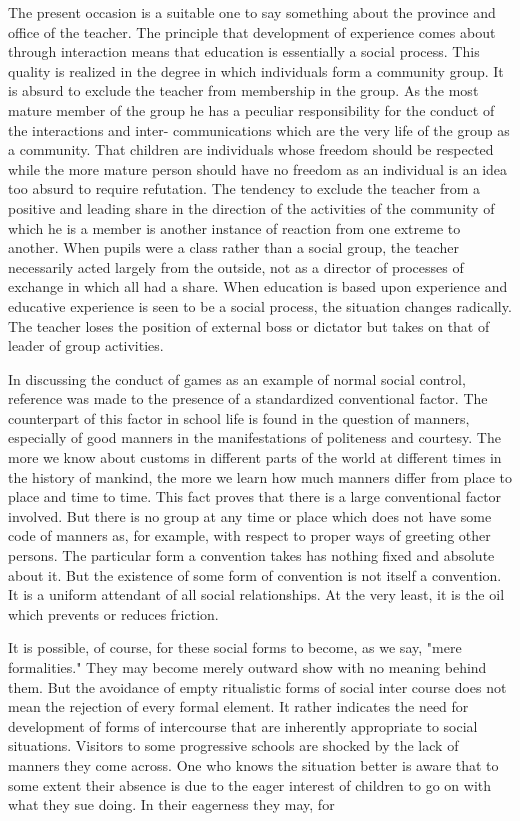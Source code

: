 The present occasion is a suitable one to say something about the province and office 
of the teacher. The principle that development of experience comes about through 
interaction means that education is essentially a social process. This quality is realized in 
the degree in which individuals form a community group. It is absurd to exclude the 
teacher from membership in the group. As the most mature member of the group he has a 
peculiar responsibility for the conduct of the interactions and inter- communications 
which are the very life of the group as a community. That children are individuals whose 
freedom should be respected while the more mature person should have no freedom as an 
individual is an idea too absurd to require refutation. The tendency to exclude the teacher 
from a positive and leading share in the direction of the activities of the community of 
which he is a member is another instance of reaction from one extreme to another. When 
pupils were a class rather than a social group, the teacher necessarily acted largely from 
the outside, not as a director of processes of exchange in which all had a share. When 
education is based upon experience and educative experience is seen to be a social 
process, the situation changes radically. The teacher loses the position of external boss or 
dictator but takes on that of leader of group activities. 

In discussing the conduct of games as an example of normal social control, reference 
was made to the presence of a standardized conventional factor. The counterpart of this 
factor in school life is found in the question of manners, especially of good manners in 
the manifestations of politeness and courtesy. The more we know about customs in 
different parts of the world at different times in the history of mankind, the more we learn 
how much manners differ from place to place and time to time. This fact proves that there 
is a large conventional factor involved. But there is no group at any time or place which 
does not have some code of manners as, for example, with respect to proper ways of 
greeting other persons. The particular form a convention takes has nothing fixed and 
absolute about it. But the existence of some form of convention is not itself a convention. 
It is a uniform attendant of all social relationships. At the very least, it is the oil which 
prevents or reduces friction. 

It is possible, of course, for these social forms to become, as we say, "mere 
formalities." They may become merely outward show with no meaning behind them. But 
the avoidance of empty ritualistic forms of social inter course does not mean the rejection 
of every formal element. It rather indicates the need for development of forms of 
intercourse that are inherently appropriate to social situations. Visitors to some 
progressive schools are shocked by the lack of manners they come across. One who 
knows the situation better is aware that to some extent their absence is due to the eager 
interest of children to go on with what they sue doing. In their eagerness they may, for 



